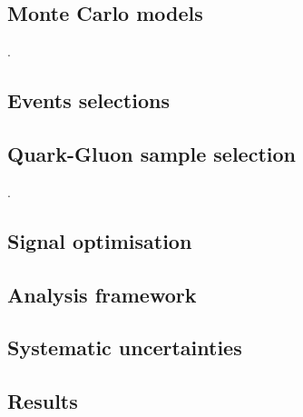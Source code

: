 \subsection{Monte Carlo models}
\label{sec:benchmark_signals}.  %

\clearpage

\subsection{Events selections}
\label{sec:event_selection}

\clearpage


\subsection{Quark-Gluon sample selection}
\label{sec:QGselection}.  %

\clearpage

\subsection{Signal optimisation}
\label{sec:Optimisation} %

\clearpage

\subsection{Analysis framework}

\clearpage


\subsection{Systematic uncertainties}

\clearpage


\subsection{Results}

\clearpage




